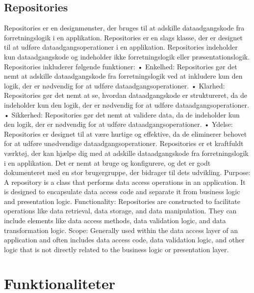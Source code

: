 \subsection{Repositories}
Repositories er en designmønster, der bruges til at adskille dataadgangskode fra forretningslogik i en applikation. Repositories er en slags klasse, der er designet til at udføre dataadgangsoperationer i en applikation. Repositories indeholder kun dataadgangskode og indeholder ikke forretningslogik eller præsentationslogik.
Repositories inkluderer følgende funktioner:
•	Enkelhed: Repositories gør det nemt at adskille dataadgangskode fra forretningslogik ved at inkludere kun den logik, der er nødvendig for at udføre dataadgangsoperationer.
•	Klarhed: Repositories gør det nemt at se, hvordan dataadgangskode er struktureret, da de indeholder kun den logik, der er nødvendig for at udføre dataadgangsoperationer.
•	Sikkerhed: Repositories gør det nemt at validere data, da de indeholder kun den logik, der er nødvendig for at udføre dataadgangsoperationer.
•	Ydelse: Repositories er designet til at være hurtige og effektive, da de eliminerer behovet for at udføre unødvendige dataadgangsoperationer.
Repositories er et kraftfuldt værktøj, der kan hjælpe dig med at adskille dataadgangskode fra forretningslogik i en applikation. Det er nemt at bruge og konfigurere, og det er godt dokumenteret med en stor brugergruppe, der bidrager til dets udvikling.
Purpose: A repository is a class that performs data access operations in an application. It is designed to encapsulate data access code and separate it from business logic and presentation logic.
Functionality: Repositories are constructed to facilitate operations like data retrieval, data storage, and data manipulation. They can include elements like data access methods, data validation logic, and data transformation logic.
Scope: Generally used within the data access layer of an application and often includes data access code, data validation logic, and other logic that is not directly related to the business logic or presentation layer.



\section{Funktionaliteter}
